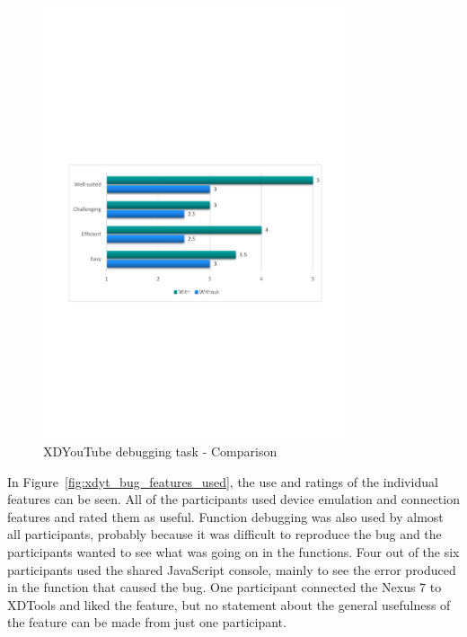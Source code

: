 \begin{figure}[H]
  \centering
    \includegraphics[trim={0 0 0.1cm 0},clip,width=0.8\textwidth]{images/charts/xdyt_bug_comparison.pdf}
	\caption[xdyt-bug: Comparison]{XDYouTube debugging task - Comparison}
	\label{fig:xdyt_bug_comparison}
\end{figure}

In Figure~\ref{fig:xdyt_bug_features_used}, the use and ratings of the individual features can be seen. All of the participants used device emulation and connection features and rated them as useful. Function debugging was also used by almost all participants, probably because it was difficult to reproduce the bug and the participants wanted to see what was going on in the functions. Four out of the six participants used the shared JavaScript console, mainly to see the error produced in the function that caused the bug. One participant connected the Nexus 7 to XDTools and liked the feature, but no statement about the general usefulness of the feature can be made from just one participant. 


